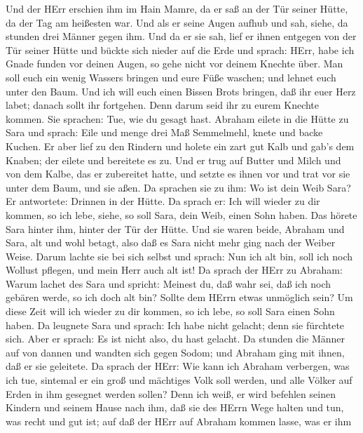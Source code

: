  Und der HErr erschien ihm im Hain Mamre, da er saß an der
Tür seiner Hütte, da der Tag am heißesten war.  Und als er
seine Augen aufhub und sah, siehe, da stunden drei Männer gegen ihm. Und
da er sie sah, lief er ihnen entgegen von der Tür seiner Hütte und
bückte sich nieder auf die Erde  und sprach: HErr, habe ich
Gnade funden vor deinen Augen, so gehe nicht vor deinem Knechte über.
 Man soll euch ein wenig Wassers bringen und eure Füße
waschen; und lehnet euch unter den Baum.  Und ich will euch
einen Bissen Brots bringen, daß ihr euer Herz labet; danach sollt ihr
fortgehen. Denn darum seid ihr zu eurem Knechte kommen. Sie sprachen:
Tue, wie du gesagt hast.  Abraham eilete in die Hütte zu
Sara und sprach: Eile und menge drei Maß Semmelmehl, knete und backe
Kuchen.  Er aber lief zu den Rindern und holete ein zart gut
Kalb und gab's dem Knaben; der eilete und bereitete es zu. 
Und er trug auf Butter und Milch und von dem Kalbe, das er zubereitet
hatte, und setzte es ihnen vor und trat vor sie unter dem Baum, und sie
aßen.  Da sprachen sie zu ihm: Wo ist dein Weib Sara? Er
antwortete: Drinnen in der Hütte.  Da sprach er: Ich will
wieder zu dir kommen, so ich lebe, siehe, so soll Sara, dein Weib, einen
Sohn haben. Das hörete Sara hinter ihm, hinter der Tür der Hütte.
 Und sie waren beide, Abraham und Sara, alt und wohl
betagt, also daß es Sara nicht mehr ging nach der Weiber Weise.
 Darum lachte sie bei sich selbst und sprach: Nun ich alt
bin, soll ich noch Wollust pflegen, und mein Herr auch alt ist!
 Da sprach der HErr zu Abraham: Warum lachet des Sara und
spricht: Meinest du, daß wahr sei, daß ich noch gebären werde, so ich
doch alt bin?  Sollte dem HErrn etwas unmöglich sein? Um
diese Zeit will ich wieder zu dir kommen, so ich lebe, so soll Sara
einen Sohn haben.  Da leugnete Sara und sprach: Ich habe
nicht gelacht; denn sie fürchtete sich. Aber er sprach: Es ist nicht
also, du hast gelacht.  Da stunden die Männer auf von
dannen und wandten sich gegen Sodom; und Abraham ging mit ihnen, daß er
sie geleitete.  Da sprach der HErr: Wie kann ich Abraham
verbergen, was ich tue,  sintemal er ein groß und mächtiges
Volk soll werden, und alle Völker auf Erden in ihm gesegnet werden
sollen?  Denn ich weiß, er wird befehlen seinen Kindern und
seinem Hause nach ihm, daß sie des HErrn Wege halten und tun, was recht
und gut ist; auf daß der HErr auf Abraham kommen lasse, was er ihm
